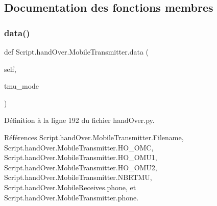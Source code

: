 \subsection{Documentation des fonctions membres}
\mbox{\label{classScript_1_1handOver_1_1MobileTransmitter_a5a0e39e384fabd4381f93ec60be74616}} 
\subsubsection{\texorpdfstring{data()}{data()}}
{\footnotesize\ttfamily def Script.\+hand\+Over.\+Mobile\+Transmitter.\+data (\begin{DoxyParamCaption}\item[{}]{self,  }\item[{}]{tmu\+\_\+mode }\end{DoxyParamCaption})}



Définition à la ligne 192 du fichier hand\+Over.\+py.



Références Script.\+hand\+Over.\+Mobile\+Transmitter.\+Filename, Script.\+hand\+Over.\+Mobile\+Transmitter.\+H\+O\+\_\+\+O\+MC, Script.\+hand\+Over.\+Mobile\+Transmitter.\+H\+O\+\_\+\+O\+M\+U1, Script.\+hand\+Over.\+Mobile\+Transmitter.\+H\+O\+\_\+\+O\+M\+U2, Script.\+hand\+Over.\+Mobile\+Transmitter.\+N\+B\+R\+T\+MU, Script.\+hand\+Over.\+Mobile\+Receives.\+phone, et Script.\+hand\+Over.\+Mobile\+Transmitter.\+phone.


